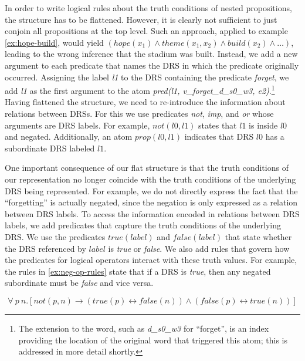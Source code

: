 In order to write logical rules about the truth conditions of nested
propositions, the structure has to be flattened. However, it is
clearly not sufficient to just conjoin all propositions at the top
level. Such an approach, applied to example
\eqref{ex:hope-build}, would yield $(hope(x_1) \land theme(x_1, x_2)
\land build(x_2) \land \ldots)$, leading to the wrong inference that
the stadium was built. 
Instead, we add a new argument to each predicate that names the DRS in
which the predicate originally occurred. Assigning the label
\textit{l1} to the DRS containing the predicate \textit{forget}, we
add {\it l1} as the first argument to the atom
{\it pred(l1, v\_forget\_d\_s0\_w3, e2)}.\footnote{The extension to the word,
such as {\it d\_s0\_w3} for ``forget'', is an index providing the location of
the original word that triggered this atom; this is addressed in more detail
shortly.} Having flattened the structure, we need to re-introduce the
information about relations between DRSs. For this we use predicates {\it not}, {\it imp},
and {\it or} whose arguments are DRS labels. For example, $not(l0, l1)$ states 
that $l1$ is inside $l0$ and negated.  Additionally, an atom $prop(l0, l1)$
indicates that DRS $l0$ has a subordinate DRS labeled $l1$.  

One important consequence of our flat structure is that the truth
conditions of our representation no longer coincide with the truth conditions of
the underlying DRS being represented.  
For example, we do not directly express the fact that the ``forgetting'' is actually
negated, since the negation is only expressed as a relation between DRS
labels. 
To access the information encoded in relations between DRS labels, we
add predicates that
capture the truth conditions of the underlying DRS.  We use the  predicates
$true(label)$ and $false(label)$ that state whether the DRS referenced by
$label$ is {\it true} or {\it false}.  We also add rules that
govern how the predicates for logical operators interact with these truth
values.  For example, the rules in \eqref{ex:neg-op-rules} state that if a DRS
is {\it true}, then any negated subordinate must be {\it false} and vice versa.

\begin{equation}\label{ex:neg-op-rules}
\forall~p~n.[not(p,n) \rightarrow (true(p) \leftrightarrow false(n)) \land
(false(p) \leftrightarrow true(n))]
\end{equation}


